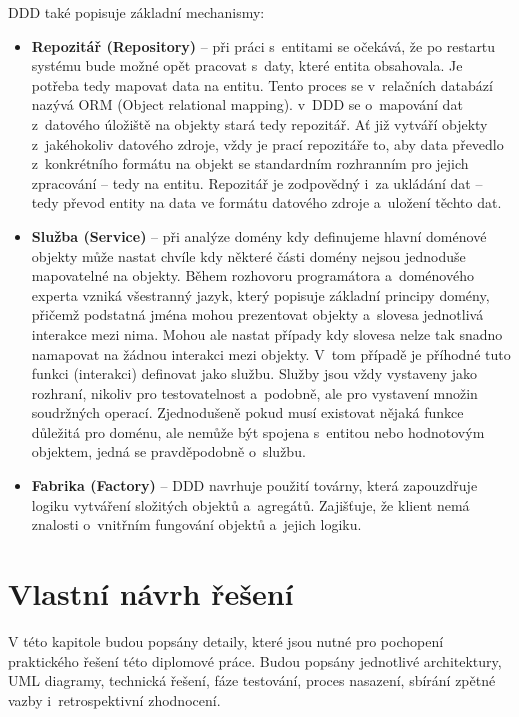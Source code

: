 DDD také popisuje základní mechanismy:

\begin{itemize} 
	\item \textbf{Repozitář (Repository)} -- při práci s~entitami se očekává, že po restartu systému bude možné opět pracovat s~daty, které entita obsahovala. Je potřeba tedy mapovat data na entitu. Tento proces se v~relačních databází nazývá ORM (Object relational mapping). v~DDD se o~mapování dat z~datového úložiště na objekty stará tedy repozitář. Ať již vytváří objekty z~jakéhokoliv datového zdroje, vždy je prací repozitáře to, aby data převedlo z~konkrétního formátu na objekt se standardním rozhranním pro jejich zpracování – tedy na entitu. Repozitář je zodpovědný i~za ukládání dat – tedy převod entity na data ve formátu datového zdroje a~uložení těchto dat.
	\item \textbf{Služba (Service)} -- při analýze domény kdy definujeme hlavní doménové objekty může nastat chvíle kdy některé části domény nejsou jednoduše mapovatelné na objekty. Během rozhovoru programátora a~doménového experta vzniká všestranný jazyk, který popisuje základní principy domény, přičemž podstatná jména mohou prezentovat objekty a~slovesa jednotlivá interakce mezi nima. Mohou ale nastat případy kdy slovesa nelze tak snadno namapovat na žádnou interakci mezi objekty. V~tom případě je příhodné tuto funkci (interakci) definovat jako službu. Služby jsou vždy vystaveny jako rozhraní, nikoliv pro testovatelnost a~podobně, ale pro vystavení množin soudržných operací. Zjednodušeně pokud musí existovat nějaká funkce důležitá pro doménu, ale nemůže být spojena s~entitou nebo hodnotovým objektem, jedná se pravděpodobně o~službu.
	\item \textbf{Fabrika (Factory)} -- DDD navrhuje použití továrny, která zapouzdřuje logiku vytváření složitých objektů a~agregátů. Zajišťuje, že klient nemá znalosti o~vnitřním fungování objektů a~jejich logiku.
\end{itemize}

\section{Vlastní návrh řešení}

V této kapitole budou popsány detaily, které jsou nutné pro pochopení praktického řešení této diplomové práce. Budou popsány jednotlivé architektury, UML diagramy, technická řešení, fáze testování, proces nasazení, sbírání zpětné vazby i~retrospektivní zhodnocení. 

